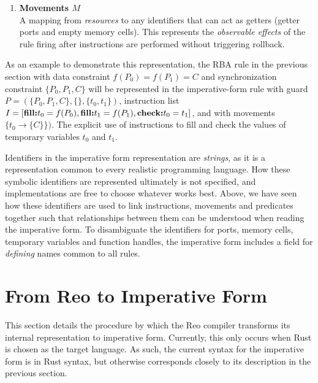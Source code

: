 \begin{enumerate}
	\item \textbf{Movements $M$}\\
	A mapping from \textit{resources} to any identifiers that can act as getters (getter ports and empty memory cells). This represents the \textit{observable effects} of the rule firing after instructions are performed without triggering rollback. 
\end{enumerate}

As an example to demonstrate this representation, the RBA rule in the previous section with data constraint $f(P_0)=f(P_1)=C$
 and synchronization constraint $\{P_0, P_1, C\}$ will be represented in the imperative-form rule with guard $P=(\{P_0, P_1, C\}, \{\}, \{t_0,t_1\})$, instruction list $I=[\text{\textbf{fill:}}t_0=f(P_0), \text{\textbf{fill:}}t_1=f(P_1), \text{\textbf{check:}}t_0=t_1]$, and with movements $\{t_0\rightarrow\{C\}\})$. The explicit use of instructions to fill and check the values of temporary variables $t_0$ and $t_1$.

Identifiers in the imperative form representation are \textit{strings}, as it is a representation common to every realistic programming language. How these symbolic identifiers are represented ultimately is not specified, and implementations are free to choose whatever works best. Above, we have seen how these identifiers are used to link instructions, movements and predicates together such that relationships between them can be understood when reading the imperative form. To disambiguate the identifiers for ports, memory cells, temporary variables and function handles, the imperative form includes a field for \textit{defining} names common to all rules. 
 

\section{From Reo to Imperative Form}
This section details the procedure by which the Reo compiler transforms its internal representation to imperative form. Currently, this only occurs when Rust is chosen as the target language. As such, the current syntax for the imperative form is in Rust syntax, but otherwise corresponds closely to its description in the previous section.

